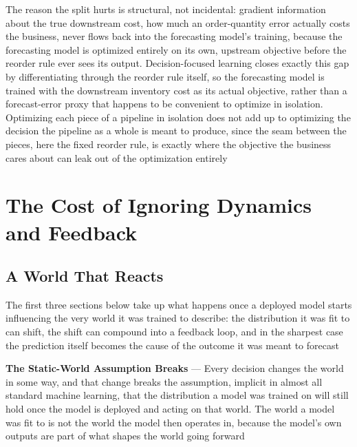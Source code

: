 The reason the split hurts is structural, not incidental: gradient information about
the true downstream cost, how much an order-quantity error actually costs the
business, never flows back into the forecasting model's training, because the
forecasting model is optimized entirely on its own, upstream objective before the
reorder rule ever sees its output. Decision-focused learning closes exactly this
gap by differentiating through the reorder rule itself, so the forecasting model
is trained with the downstream inventory cost as its actual objective, rather
than a forecast-error proxy that happens to be convenient to optimize in
isolation. Optimizing each piece of a pipeline in isolation does not add up to optimizing
the decision the pipeline as a whole is meant to produce, since the seam between
the pieces, here the fixed reorder rule, is exactly where the objective the
business cares about can leak out of the optimization entirely

\section{The Cost of Ignoring Dynamics and Feedback}
\label{chap:cost-ignoring-dynamics-feedback}

\subsection{A World That Reacts}
\label{sec:world-that-reacts}

The first three sections below take up what happens once a deployed model starts
influencing the very world it was trained to describe: the distribution it was
fit to can shift, the shift can compound into a feedback loop, and in the
sharpest case the prediction itself becomes the cause of the outcome it was
meant to forecast

\textbf{The Static-World Assumption Breaks} --- Every decision changes the world
in some way, and that change breaks the assumption, implicit in almost all
standard machine learning, that the distribution a model was trained on will still
hold once the model is deployed and acting on that world. The world a model was
fit to is not the world the model then operates in, because the model's own outputs
are part of what shapes the world going forward

